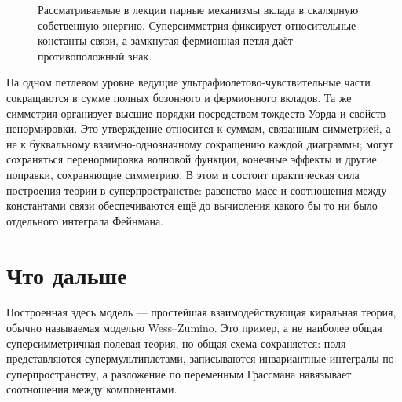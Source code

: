 \begin{figure}[H]
\centering
{}
\caption{Рассматриваемые в лекции парные механизмы вклада в скалярную собственную энергию. Суперсимметрия фиксирует относительные константы связи, а замкнутая фермионная петля даёт противоположный знак.}
\end{figure}

На одном петлевом уровне ведущие ультрафиолетово-чувствительные части сокращаются в сумме полных бозонного и фермионного вкладов. Та же симметрия организует высшие порядки посредством тождеств Уорда и свойств ненормировки. Это утверждение относится к суммам, связанным симметрией, а не к буквальному взаимно-однозначному сокращению каждой диаграммы; могут сохраняться перенормировка волновой функции, конечные эффекты и другие поправки, сохраняющие симметрию. В этом и состоит практическая сила построения теории в суперпространстве: равенство масс и соотношения между константами связи обеспечиваются ещё до вычисления какого бы то ни было отдельного интеграла Фейнмана.

\section{Что дальше}

Построенная здесь модель — простейшая взаимодействующая киральная теория, обычно называемая моделью Wess--Zumino. Это пример, а не наиболее общая суперсимметричная полевая теория, но общая схема сохраняется: поля представляются супермультиплетами, записываются инвариантные интегралы по суперпространству, а разложение по переменным Грассмана навязывает соотношения между компонентами.


